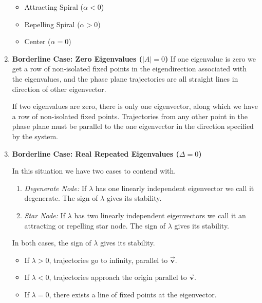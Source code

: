 \documentclass[12pt,landscape,twocolumn]{article}
\let\oldvec\vec
\renewcommand{\vec}[1]{\oldvec{\mathbf{ #1 } } }                    %
\begin{document}
\begin{enumerate}
                \begin{itemize}
                    \item Attracting Spiral ($\alpha < 0$)
                    \item Repelling Spiral ($\alpha > 0$)
                    \item Center ($\alpha = 0$)
                \end{itemize}

            \item \textbf{Borderline Case: Zero Eigenvalues ($|A| = 0$)}
                If one eigenvalue is zero we get a row of non-isolated fixed points in the eigendirection associated with the eigenvalues, and the phase plane trajectories are all straight lines in direction of other eigenvector.

                If two eigenvalues are zero, there is only one eigenvector, along which we have a row of non-isolated fixed points. Trajectories from any other point in the phase plane must be parallel to the one eigenvector in the direction specified by the system.

            \item \textbf{Borderline Case: Real Repeated Eigenvalues ($\Delta = 0$)}

                In this situation we have two cases to contend with.

                \begin{enumerate}
                    \item \textit{Degenerate Node:} If $\lambda$ has one linearly independent eigenvector we call it degenerate. The sign of $\lambda$ gives its stability.
                    \item \textit{Star Node:} If $\lambda$ has two linearly independent eigenvectors we call it an attracting or repelling star node. The sign of $\lambda$ gives its stability.
                \end{enumerate}

                In both cases, the sign of $\lambda$ gives its stability.

                    \begin{itemize}
                        \item If $\lambda > 0$, trajectories go to infinity, parallel to $\vec{v}$.
                        \item If $\lambda < 0$, trajectories approach the origin parallel to $\vec{v}$.
                        \item If $\lambda = 0$, there exists a line of fixed points at the eigenvector.
                    \end{itemize}
    \end{enumerate}
\end{document}
